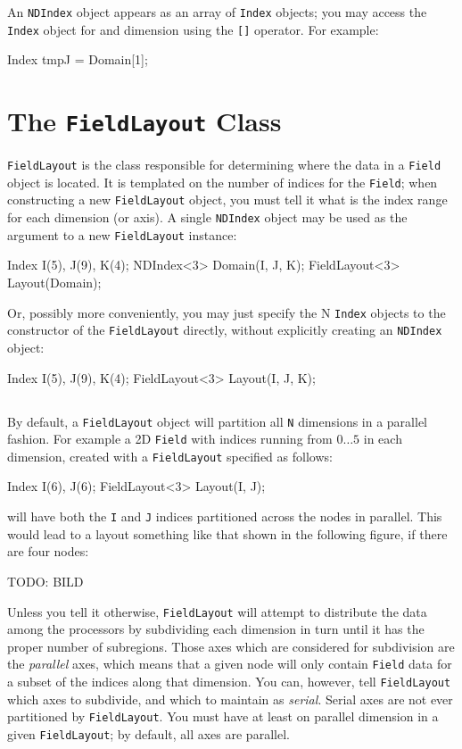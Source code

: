 An \texttt{NDIndex} object appears as an array of \texttt{Index} objects; you may access the \texttt{Index} object for and dimension using the \texttt{[]} operator. For example:
\begin{smallcode}
Index tmpJ = Domain[1];
\end{smallcode}

\section{The \texttt{FieldLayout} Class}

\texttt{FieldLayout} is the class responsible for determining where the data in a \texttt{Field} object is located. It is templated on the number of indices for the \texttt{Field}; when constructing a new \texttt{FieldLayout} object, you must tell it what is the index range for each dimension (or axis). A single \texttt{NDIndex} object may be used as the argument to a new \texttt{FieldLayout} instance:
\begin{smallcode}
Index I(5), J(9), K(4);
NDIndex<3> Domain(I, J, K);
FieldLayout<3> Layout(Domain);
\end{smallcode}
Or, possibly more conveniently, you may just specify the N \texttt{Index} objects to the constructor of the \texttt{FieldLayout} directly, without explicitly creating an \texttt{NDIndex} object:
\begin{smallcode}
Index I(5), J(9), K(4);
FieldLayout<3> Layout(I, J, K);
\end{smallcode}

\subsection{}

By default, a \texttt{FieldLayout} object will partition all \texttt{N} dimensions in a parallel fashion. For example a 2D \texttt{Field} with indices running from $0 \ldots 5$ in each dimension, created with a \texttt{FieldLayout} specified as follows:
\begin{smallcode}
Index I(6), J(6);
FieldLayout<3> Layout(I, J);
\end{smallcode}
will have both the \texttt{I} and \texttt{J} indices partitioned across the nodes in parallel. This would lead to a layout something like that shown in the following figure, if there are four nodes:

TODO: BILD

Unless you tell it otherwise, \texttt{FieldLayout} will attempt to distribute the data among the processors by subdividing each dimension in turn until it has the proper number of subregions. Those axes which are considered for subdivision are the \textit{parallel} axes, which means that a given node will only contain \texttt{Field} data for a subset of the indices along that dimension. You can, however, tell \texttt{FieldLayout} which axes to subdivide, and which to maintain as \textit{serial}. Serial axes are
not ever partitioned by \texttt{FieldLayout}. You must have at least on parallel dimension in a given \texttt{FieldLayout}; by default, all axes are parallel.

